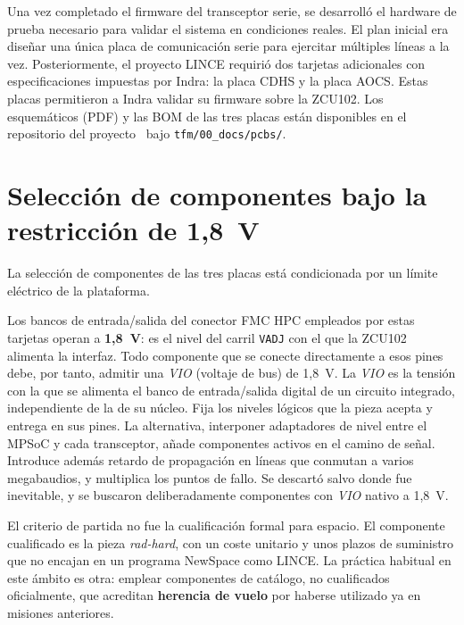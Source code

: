 
Una vez completado el firmware del transceptor serie, se desarrolló el hardware de prueba
necesario para validar el sistema en condiciones reales. El plan inicial era diseñar una única
placa de comunicación serie para ejercitar múltiples líneas a la vez. Posteriormente, el proyecto
LINCE requirió dos tarjetas adicionales con especificaciones impuestas por Indra: la placa CDHS y
la placa AOCS. Estas placas permitieron a Indra validar su firmware sobre la ZCU102. Los
esquemáticos (PDF)
y las BOM de las tres placas están disponibles en el repositorio del proyecto~\cite{repo_tfm} bajo
\texttt{tfm/00\_docs/pcbs/}.

\section{Selección de componentes bajo la restricción de 1,8~V} \label{sec:seleccion_componentes}

La selección de componentes de las tres placas está condicionada por un límite eléctrico de la
plataforma.

Los bancos de entrada/salida del conector FMC HPC empleados por estas tarjetas operan a
\textbf{1,8~V}: es el nivel del carril \texttt{VADJ} con el que la ZCU102 alimenta la interfaz. Todo
componente que se conecte directamente a esos pines debe, por tanto, admitir una
\textit{VIO} (voltaje de bus) de 1,8~V. La \textit{VIO} es la tensión con la que se alimenta el
banco de entrada/salida digital de un circuito integrado, independiente de la de su núcleo. Fija
los niveles lógicos que la pieza acepta y entrega en sus pines. La alternativa, interponer
adaptadores de nivel entre el MPSoC y cada transceptor, añade componentes activos en el camino de
señal. Introduce además retardo de propagación en líneas que conmutan a varios megabaudios, y
multiplica los puntos de fallo. Se descartó salvo donde fue inevitable, y se buscaron
deliberadamente componentes con \textit{VIO} nativo a 1,8~V.

El criterio de partida no fue la cualificación formal para espacio. El componente cualificado es
la pieza \textit{rad-hard}, con un coste unitario y unos plazos de suministro que no encajan en un
programa NewSpace como LINCE. La práctica habitual en este ámbito es otra: emplear componentes de
catálogo, no cualificados oficialmente, que acreditan \textbf{herencia de vuelo} por haberse
utilizado ya en misiones anteriores.

